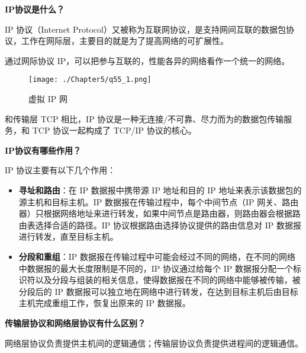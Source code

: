 \documentclass[cn,11pt,color=blue,lang=cn]{elegantbook}
\begin{document}
\begin{solution}

\begin{note} \textbf{IP协议是什么？} \end{note}
IP 协议（Internet Protocol）又被称为互联网协议，是支持网间互联的数据包协议，工作在网际层，主要目的就是为了提高网络的可扩展性。

通过网际协议 IP，可以把参与互联的，性能各异的网络看作一个统一的网络。
\begin{figure}[!h]
\centering
\texttt{[image: ./Chapter5/q55\_1.png]}
\caption{虚拟 IP 网}
\label{fig55_1}
\end{figure}

和传输层 TCP 相比，IP 协议是一种无连接/不可靠、尽力而为的数据包传输服务，和 TCP 协议一起构成了 TCP/IP 协议的核心。

\begin{note} \textbf{IP协议有哪些作用？} \end{note}

IP 协议主要有以下几个作用：
\begin{itemize}
	\item \textbf{寻址和路由}：在 IP 数据报中携带源 IP 地址和目的 IP 地址来表示该数据包的源主机和目标主机。IP 数据报在传输过程中，每个中间节点（IP 网关、路由器）只根据网络地址来进行转发，如果中间节点是路由器，则路由器会根据路由表选择合适的路径。IP 协议根据路由选择协议提供的路由信息对 IP 数据报进行转发，直至目标主机。
	\item \textbf{分段和重组}：IP 数据报在传输过程中可能会经过不同的网络，在不同的网络中数据报的最大长度限制是不同的，IP 协议通过给每个 IP 数据报分配一个标识符以及分段与组装的相关信息，使得数据报在不同的网络中能够被传输，被分段后的 IP 数据报可以独立地在网络中进行转发，在达到目标主机后由目标主机完成重组工作，恢复出原来的 IP 数据报。
\end{itemize}

\begin{note} \textbf{传输层协议和网络层协议有什么区别？} \end{note}

网络层协议负责提供主机间的逻辑通信；传输层协议负责提供进程间的逻辑通信。
\end{solution}
\end{document}
